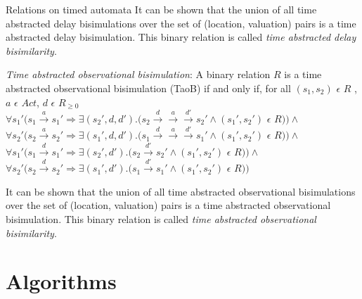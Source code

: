 \documentclass{beamer}
\begin{document}
\begin{frame}[allowframebreaks]{Relations on timed automata}
It can be shown that the
  union of all time abstracted delay bisimulations over the set of
  (location, valuation) pairs is a time abstracted delay
  bisimulation. This binary relation is called \textit{time abstracted
    delay bisimilarity}.

\begin{definition}
  \emph{Time abstracted observational bisimulation}: A binary relation
  $R$ is a time abstracted observational bisimulation (TaoB) if and only if, for all
  $(s_1, s_2)$ $\epsilon$ $R$ , $a$ $\epsilon$ $Act $, $d$ $\epsilon$ $R_{\ge 0}$\\
  $\forall s_1' (s_1 \xrightarrow{a} s_1' \Rightarrow \exists (s_2',
  d, d') . (s_2 \xrightarrow{d} \xrightarrow{a} \xrightarrow{d'} s_2'
  \wedge (s_1', s_2')$ $\epsilon$ $R ) ) \wedge $ \\
  $\forall s_2' (s_2 \xrightarrow{a} s_2' \Rightarrow \exists (s_1',
  d, d') . (s_1 \xrightarrow{d} \xrightarrow{a} \xrightarrow{d'} s_1'
  \wedge (s_1', s_2')$ $\epsilon$ $R ) ) \wedge $ \\
  $\forall s_1' (s_1 \xrightarrow{d} s_1' \Rightarrow \exists (s_2',
  d')
  . (s_2 \xrightarrow{d'} s_2' \wedge (s_1', s_2')$ $\epsilon$ $R ) )
  \wedge $ \\
  $\forall s_2' (s_2 \xrightarrow{d} s_2' \Rightarrow \exists (s_1', d')
  . (s_1 \xrightarrow{d'} s_1' \wedge (s_1', s_2')$ $\epsilon$ $R ) ) $ \\
\end{definition}

It can be shown that
  the union of all time abstracted observational bisimulations over the
  set of (location, valuation) pairs is a time abstracted observational
  bisimulation. This binary relation is called \textit{time abstracted
    observational bisimilarity}.

\end{frame}

\section{Algorithms}
\end{document}
